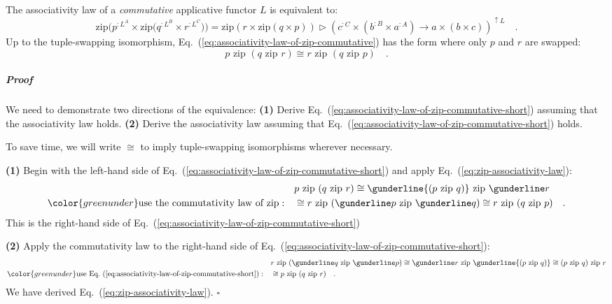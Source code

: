 The associativity law of a \emph{commutative} applicative functor
$L$ is equivalent to:
\begin{equation}
\text{zip}\big(p^{:L^{A}}\times\text{zip}\big(q^{:L^{B}}\times r^{:L^{C}}\big)\big)=\text{zip}\left(r\times\text{zip}\left(q\times p\right)\right)\triangleright(c^{:C}\times(b^{:B}\times a^{:A})\rightarrow a\times(b\times c))^{\uparrow L}\quad.\label{eq:associativity-law-of-zip-commutative}
\end{equation}
Up to the tuple-swapping isomorphism, Eq.~(\ref{eq:associativity-law-of-zip-commutative})
has the form where only $p$ and $r$ are swapped:
\begin{equation}
p\,\,\text{zip}\,\,(q\,\,\text{zip}\,\,r)\cong r\,\,\text{zip}\,\,(q\,\,\text{zip}\,\,p)\quad.\label{eq:associativity-law-of-zip-commutative-short}
\end{equation}


\subparagraph{Proof}

We need to demonstrate two directions of the equivalence: \textbf{(1)}
Derive Eq.~(\ref{eq:associativity-law-of-zip-commutative-short})
assuming that the associativity law holds. \textbf{(2)} Derive the
associativity law assuming that Eq.~(\ref{eq:associativity-law-of-zip-commutative-short})
holds.

To save time, we will write $\cong$ to imply tuple-swapping isomorphisms
wherever necessary.

\textbf{(1)} Begin with the left-hand side of Eq.~(\ref{eq:associativity-law-of-zip-commutative-short})
and apply Eq.~(\ref{eq:zip-associativity-law}):
\begin{align*}
 & p\,\,\text{zip}\,\,(q\,\,\text{zip}\,\,r)\cong\gunderline{(p\,\,\text{zip}\,\,q)}\,\,\text{zip}\,\,\gunderline r\\
{\color{greenunder}\text{use the commutativity law of }\text{zip}:}\quad & \cong r\,\,\text{zip}\,\,(\gunderline p\,\,\text{zip}\,\,\gunderline q)\cong r\,\,\text{zip}\,\,(q\,\,\text{zip}\,\,p)\quad.
\end{align*}
This is the right-hand side of Eq.~(\ref{eq:associativity-law-of-zip-commutative-short})

\textbf{(2)} Apply the commutativity law to the right-hand side of
Eq.~(\ref{eq:associativity-law-of-zip-commutative-short}):
\begin{align*}
 & r\,\,\text{zip}\,\,(\gunderline q\,\,\text{zip}\,\,\gunderline p)\cong\gunderline r\,\,\text{zip}\,\,\gunderline{(p\,\,\text{zip}\,\,q)}\cong(p\,\,\text{zip}\,\,q)\,\,\text{zip}\,\,r\\
{\color{greenunder}\text{use Eq.~(\ref{eq:associativity-law-of-zip-commutative-short})}:}\quad & \cong p\,\,\text{zip}\,\,(q\,\,\text{zip}\,\,r)\quad.
\end{align*}
We have derived Eq.~(\ref{eq:zip-associativity-law}). $\square$

